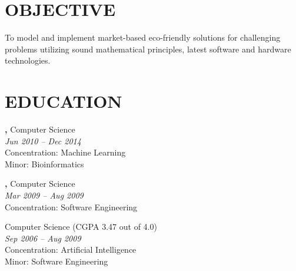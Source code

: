 \documentclass[margin, 10pt]{res} %
\begin{document}
\begin{resume}

 
\section{OBJECTIVE}  

To model and implement market-based eco-friendly solutions for challenging problems utilizing sound mathematical principles, latest software and hardware technologies.



\section{EDUCATION}

{\bf \color{Black}{Doctor of Philosophy},} Computer Science \\
{} \hfill \textit{Jun 2010 -- Dec 2014} \\
Concentration: Machine Learning \\
Minor: Bioinformatics 

{\bf \color{Black}{Exchange Student},} Computer Science \\
{\color{RubineRed}{University of Limerick, Ireland}} \hfill \textit{Mar 2009 -- Aug 2009} \\
Concentration: Software Engineering 

{\bf \color{Black}{Master of Science,}} Computer Science (CGPA 3.47 out of 4.0) \\
{\color{RubineRed}{Lahore University of Management Sciences (LUMS), Pakistan}} \hfill \textit{Sep 2006 -- Aug 2009} \\
Concentration: Artificial Intelligence \\
Minor: Software Engineering


\end{resume}
\end{document}
